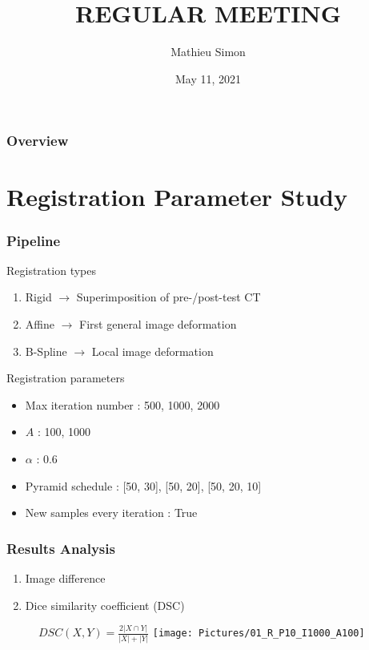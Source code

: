 \documentclass[xcolor=table]{beamer}
\title[Regular Meeting]{
\uppercase{Regular Meeting}
}
\author{Mathieu Simon}
\institute[University of Bern]
{
MSc - Biomedical Engineering \\
University of Bern, Faculty of Medicine \\
\medskip
}
\date{May 11, 2021}
\begin{document}
\begin{frame}
\titlepage
\end{frame}


\begin{frame}
	\frametitle{Overview}
	\tableofcontents
\end{frame}


\section{Registration Parameter Study}

\begin{frame}
	\frametitle{Pipeline}
	Registration types
	\begin{enumerate}
		\item Rigid $\rightarrow$ Superimposition of pre-/post-test \si{\micro}CT
		\item Affine $\rightarrow$ First general image deformation
		\item B-Spline $\rightarrow$ Local image deformation
	\end{enumerate}
	\vfill
	Registration parameters
	\begin{itemize}
		\item Max iteration number : 500, 1000, 2000
		\item $A$ : 100, 1000
		\item $\alpha$ : 0.6
		\item Pyramid schedule : [50, 30], [50, 20], [50, 20, 10]
		\item New samples every iteration : True
	\end{itemize}
\end{frame}


\begin{frame}
	\frametitle{Results Analysis}
	\begin{enumerate}
		\item Image difference
		\item Dice similarity coefficient (DSC)
	\end{enumerate}	
	\begin{figure}
		\centering
		$DSC(X,Y) = \frac{2|X \cap Y|}{|X| + |Y|}$
		\texttt{[image: Pictures/01\_R\_P10\_I1000\_A100]}
	\end{figure}
\end{frame}
\end{document}
